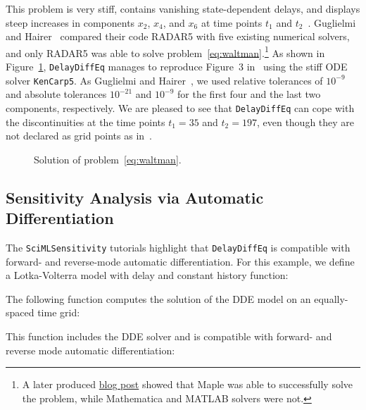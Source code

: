 \documentclass{juliacon}
\def\pkg#1{\texttt{#1}}
\def\alg#1{\texttt{#1}}
\begin{document}
This problem is very stiff, contains vanishing state-dependent delays, and
displays steep increases in components $x_2$, $x_4$, and $x_6$ at time points
$t_1$ and $t_2$~\cite{guglielmi01_implementing_radau,waltman78_threshold_model_antigen}.
Guglielmi and Hairer~\cite{guglielmi01_implementing_radau} compared their code RADAR5
with five existing numerical solvers, and only RADAR5 was able to solve
problem~\eqref{eq:waltman}.\footnote{A later produced \href{https://www.mapleprimes.com/posts/201287-Delay-Differential-Equations--Maple-Is-A-Leader}{blog post} showed that Maple was able to successfully solve the problem, while Mathematica and MATLAB solvers were not.}
As shown in Figure~\ref{fig:waltman}, \pkg{DelayDiffEq} manages
to reproduce Figure~3 in~\cite{guglielmi01_implementing_radau} using the stiff ODE
solver \alg{KenCarp5}. As Guglielmi and Hairer~\cite{guglielmi01_implementing_radau},
we used relative tolerances of $10^{-9}$ and absolute tolerances $10^{-21}$ and
$10^{-9}$ for the first four and the last two components, respectively. We are
pleased to see that \pkg{DelayDiffEq} can cope with the discontinuities at the time points
$t_1 = 35$ and $t_2 = 197$, even though they are not declared as grid points as
in~\cite{guglielmi01_implementing_radau}.

\begin{figure}
    \centering
    
    \caption{Solution of problem~\eqref{eq:waltman}.}
    \label{fig:waltman}
\end{figure}

\subsection{Sensitivity Analysis via Automatic Differentiation}

The \pkg{SciMLSensitivity} tutorials highlight that \pkg{DelayDiffEq} is compatible with forward- and reverse-mode automatic differentiation.
For this example, we define a Lotka-Volterra model with delay and constant history function:



The following function computes the solution of the DDE model on an equally-spaced time grid:



This function includes the DDE solver and is compatible with forward- and reverse mode automatic differentiation:
\end{document}
